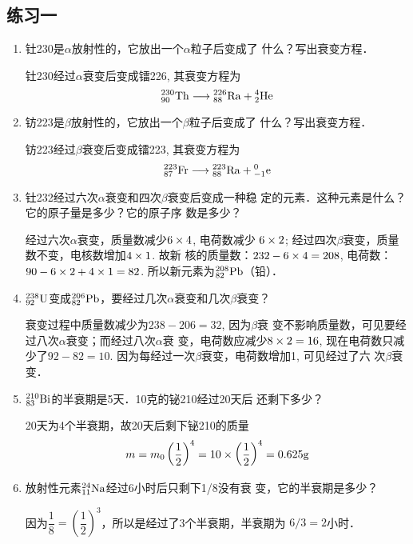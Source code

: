 \subsection{练习一}
\begin{enumerate}
    \item 钍230是$\alpha$放射性的，它放出一个$\alpha$粒子后变成了
什么？写出衰变方程．


\begin{solution}
    钍230经过$\alpha$衰变后变成镭226, 其衰变方程为
    \[\atom{Th}{230}{90}\longrightarrow \atom{Ra}{226}{88}+\atom{He}{4}{2}\]
\end{solution}
\item 钫223是$\beta$放射性的，它放出一个$\beta$粒子后变成了
什么？写出衰变方程．


\begin{solution}
    钫223经过$\beta$衰变后变成镭223, 其衰变方程为
    \[\atom{Fr}{223}{87}\longrightarrow \atom{Ra}{223}{88}+\atom{e}{0}{-1}\]
\end{solution}
\item 钍232经过六次$\alpha$衰变和四次$\beta$衰变后变成一种稳
定的元素．这种元素是什么？它的原子量是多少？它的原子序
数是多少？


\begin{solution}
    经过六次$\alpha$衰变，质量数减少$6\x4$, 电荷数减少
    $6\x2$; 经过四次$\beta$衰变，质量数不变，电核数增加$4\x1$. 故新
    核的质量数：$232-6\x4=208$, 
    电荷数：$90-6\x2+4\x1=82$. 
    所以新元素为$\atom{Pb}{208}{82}$（铅）．
\end{solution}
\item 
$\atom{U}{238}{92}$变成$\atom{Pb}{206}{82}$，要经过几次$\alpha$衰变和几次$\beta$衰变？

\begin{solution}
    衰变过程中质量数减少为$238-206=32$, 因为$\beta$衰
    变不影响质量数，可见要经过八次$\alpha$衰变；而经过八次$\alpha$衰
    变，电荷数应减少$8\x2=16$, 现在电荷数只减少了$92-82
    =10$. 因为每经过一次$\beta$衰变，电荷数增加1, 可见经过了六
    次$\beta$衰变．
\end{solution}
\item 
$\atom{Bi}{210}{83}$的半衰期是5天．10克的铋210经过20天后
还剩下多少？


\begin{solution}
    20天为4个半衰期，故20天后剩下铋210的质量
\[m=m_0\left(\frac{1}{2}\right)^4=10\x \left(\frac{1}{2}\right)^4=0.625{\rm g}\]
\end{solution}
\item 放射性元素$\atom{Na}{24}{11}$经过6小时后只剩下1/8没有衰
变，它的半衰期是多少？


\begin{solution}
因为$\dfrac{1}{8}=\left(\dfrac{1}{2}\right)^3$，所以是经过了3个半衰期，半衰期为
$6/3=2$小时．
\end{solution}
\end{enumerate}




